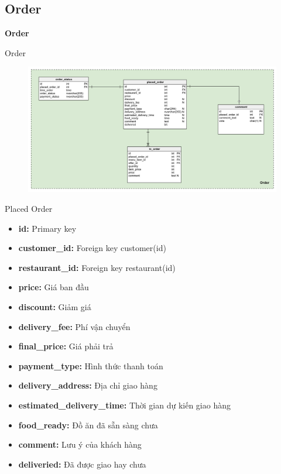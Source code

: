 \documentclass[aspectratio=43,xcolor=dvipsnames]{beamer}
\begin{document}
	\subsection{Order}
	\begin{frame}
		\textcolor{structure}{\Huge{\textbf{Order}}}
	\end{frame}
	\begin{frame}{Order}
		\begin{figure}[ht!]
			\centerline{\includegraphics[width=1\textwidth]{order.png}}
			\label{fig:ass1}
		\end{figure}
	\end{frame}
	\begin{frame}{Placed Order}
		\begin{itemize}
			\item \textbf{id:} Primary key
			\item \textbf{customer\_id:} Foreign key customer(id)
			\item \textbf{restaurant\_id:} Foreign key restaurant(id)
			\item \textbf{price:} Giá ban đầu
			\item \textbf{discount:} Giảm giá 
			\item \textbf{delivery\_fee: }Phí vận chuyển
			\item \textbf{final\_price:} Giá phải trả
			\item \textbf{payment\_type:} Hình thức thanh toán
			\item \textbf{delivery\_address:} Địa chỉ giao hàng 
			\item \textbf{estimated\_delivery\_time:} Thời gian dự kiến giao hàng
			\item \textbf{food\_ready:} Đồ ăn đã sẵn sàng chưa
			\item \textbf{comment:} Lưu ý của khách hàng
			\item \textbf{deliveried:} Đã được giao hay chưa
		\end{itemize}
	\end{frame}
	
\end{document}

